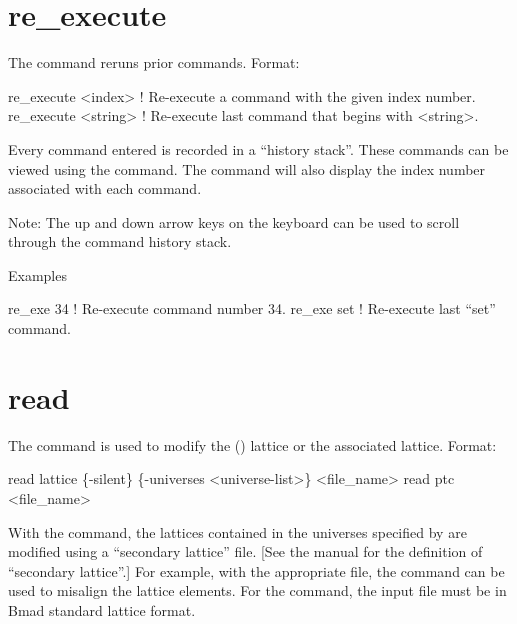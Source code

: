 \section{re_execute}
\label{s:re.exe}

The  command reruns prior commands.  Format:
\begin{example}
  re_execute <index>   ! Re-execute a command with the given index number.
  re_execute <string>  ! Re-execute last command that begins with <string>.
\end{example}

\vskip 10pt 

Every \tao command entered is recorded in a ``history stack''. These commands can be viewed using
the  command. The  command will also display the index number
associated with each command.

Note: The up and down arrow keys on the keyboard can be used to scroll through the command history
stack.

Examples
\begin{example}
  re_exe 34   ! Re-execute command number 34.
  re_exe set  ! Re-execute last ``set'' command.  
\end{example}

\section{read}
\label{s:read}

The  command is used to modify the (\bmad)  lattice or the associated
 lattice. Format:
\begin{example}
  read lattice \{-silent\} \{-universes <universe-list>\} <file_name>
  read ptc <file_name>
\end{example}

\vskip 10pt 

With the  command, the  lattices contained in the universes specified by
 are modified using a ``secondary lattice'' file.  [See the \bmad manual for the
definition of ``secondary lattice''.] For example, with the appropriate file, the  command
can be used to misalign the lattice elements. For the  command, the input file must
be in Bmad standard lattice format.

